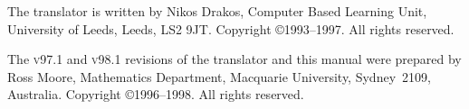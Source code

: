 \smallskip
{}\html{\\}%
The \latextohtml{} translator is written by Nikos Drakos,
Computer Based Learning Unit,  University of Leeds,  Leeds,  LS2 9JT.
Copyright \copyright 1993--1997. All rights reserved.

\smallskip
{}\html{\\}%
The \textsc{v97.1} and \textsc{v98.1} revisions of the \latextohtml{}
translator and this manual were prepared by
Ross Moore, Mathematics Department,
Macquarie University,  Sydney~2109,  Australia.
Copyright \copyright 1996--1998. All rights reserved.








